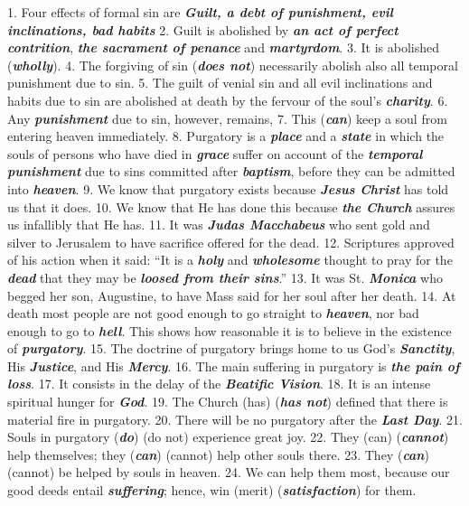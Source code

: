 \documentclass[a4paper,14pt]{memoir}
\newcommand\answer[1]{\textbf{\textit{#1}}}
\begin{document}
1. Four effects of formal sin are \answer{Guilt, a debt of punishment, evil inclinations, bad habits}
2.   Guilt
is  abolished  by  \answer{an act of perfect contrition}, \answer{the sacrament of penance}  and  \answer{martyrdom}. 
3.   It  is  abolished 
(\answer{wholly}).
4.  The forgiving of sin (\answer{does  not})  necessarily  abolish
also all temporal punishment due to sin.
5.  The guilt of venial sin and  all
evil inclinations and habits due to  sin  are  abolished  at  death  by  the
fervour of the soul's \answer{charity}.
6.  Any \answer{punishment} due to  sin,  however,  remains,
7. This (\answer{can}) keep a soul  from  entering  heaven  immediately. 
8. 
Purgatory is a \answer{place} and a \answer{state} in which the souls of  persons  who  have
died in \answer{grace} suffer on account of the \answer{temporal punishment} due to sins  committed  after
\answer{baptism}, before they can be admitted into \answer{heaven}.
9.  We know  that  purgatory
exists because \answer{Jesus Christ} has told us that it does.
10.   We  know  that  He  has
done this because \answer{the Church} assures us infallibly  that  He  has. 
11.   It  was
\answer{Judas Macchabeus} who sent gold and silver to Jerusalem to have sacrifice  offered  for
the dead.
12.  Scriptures approved of his action  when  it  said:  ``It  is  a
\answer{holy} and \answer{wholesome} thought to pray for the \answer{dead} that they may  be  \answer{loosed from their sins}.''
13. It was St. \answer{Monica} who begged her son, Augustine, to have Mass  said  for
her soul after her death.
14.  At death most people are not  good  enough  to
go straight to \answer{heaven}, nor bad enough  to  go  to  \answer{hell}.  This  shows  how
reasonable it is to believe in the existence of \answer{purgatory}. 
15.   The  doctrine
of purgatory brings home to us God's \answer{Sanctity}, His  \answer{Justice},  and  His  \answer{Mercy}.
16. The main suffering in purgatory is \answer{the pain of loss}.
17.  It consists in the  delay
of the \answer{Beatific Vision}.
18.  It is an intense spiritual hunger  for  \answer{God}. 
19.   The
Church (has) (\answer{has not}) defined that there is  material  fire  in  purgatory.
20. There will be no purgatory after the  \answer{Last Day}. 
21.   Souls  in  purgatory
(\answer{do})  (do  not)  experience  great  joy. 
22.   They  (can)   (\answer{cannot})   help
themselves; they (\answer{can}) (cannot) help  other  souls  there. 
23.   They  (\answer{can})
(cannot) be helped by souls in heaven.
24.  We can help  them  most,  because
our good deeds entail \answer{suffering}; hence, win (merit)  (\answer{satisfaction})  for  them.
\end{document}

